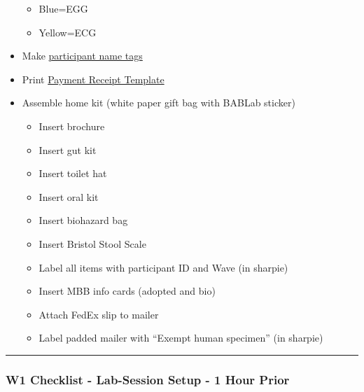 \documentclass[
]{book}
\providecommand{\tightlist}{%
  \setlength{\itemsep}{0pt}\setlength{\parskip}{0pt}}
\begin{document}
\begin{itemize}
  \begin{itemize}
  \tightlist
  \item
    Blue=EGG
  \item
    Yellow=ECG
  \end{itemize}
\item
  Make \href{https://app.box.com/file/630320259767}{participant name tags}
\item
  Print \href{https://app.box.com/file/630326568873}{Payment Receipt Template}
\item
  Assemble home kit (white paper gift bag with BABLab sticker)

  \begin{itemize}
  \tightlist
  \item
    Insert brochure
  \item
    Insert gut kit
  \item
    Insert toilet hat
  \item
    Insert oral kit
  \item
    Insert biohazard bag
  \item
    Insert Bristol Stool Scale
  \item
    Label all items with participant ID and Wave (in sharpie)
  \item
    Insert MBB info cards (adopted and bio)
  \item
    Attach FedEx slip to mailer
  \item
    Label padded mailer with ``Exempt human specimen'' (in sharpie)
  \end{itemize}
\end{itemize}

\begin{center}\rule{0.5\linewidth}{0.5pt}\end{center}

\hypertarget{w1-checklist---lab-session-setup---1-hour-prior}{%
\subsubsection{W1 Checklist - Lab-Session Setup - 1 Hour Prior}\label{w1-checklist---lab-session-setup---1-hour-prior}}
\end{document}
